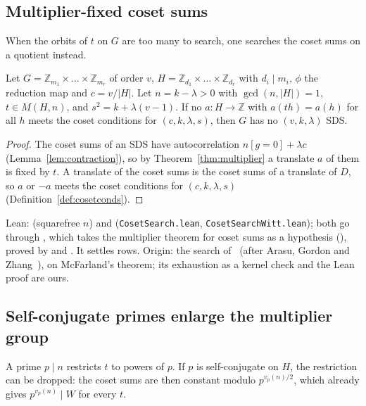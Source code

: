 \subsection{Multiplier-fixed coset sums}

When the orbits of $t$ on $G$ are too many to search, one searches the coset sums on a
quotient instead.

\begin{theorem}\label{thm:z28}
Let $G = \mathbb{Z}_{m_1} \times \dots \times \mathbb{Z}_{m_r}$ of order $v$,
$H = \mathbb{Z}_{d_1} \times \dots \times \mathbb{Z}_{d_r}$ with $d_i \mid m_i$, $\phi$ the
reduction map and $c = v/|H|$. Let $n = k - \lambda > 0$ with $\gcd(n, |H|) = 1$,
$t \in M(H, n)$, and $s^2 = k + \lambda(v-1)$. If no $a \colon H \to \mathbb{Z}$ with
$a(th) = a(h)$ for all $h$ meets the coset conditions for $(c, k, \lambda, s)$, then $G$ has no
$(v, k, \lambda)$ SDS.
\end{theorem}

\begin{proof}
The coset sums of an SDS have autocorrelation $n[g = 0] + \lambda c$
(Lemma~\ref{lem:contraction}), so by Theorem~\ref{thm:multiplier} a translate $a$ of them is
fixed by $t$. A translate of the coset sums is the coset sums of a translate of $D$, so $a$ or
$-a$ meets the coset conditions for $(c, k, \lambda, s)$ (Definition~\ref{def:cosetconds}).
\end{proof}

\begin{remark}
Lean:  (squarefree $n$) and 
(\texttt{CosetSearch.lean}, \texttt{CosetSearchWitt.lean}); both go through
, which takes the multiplier theorem for coset sums as a
hypothesis (), proved by  and
. It settles  rows. Origin: the search
of~\cite[\S5]{gordon} (after Arasu, Gordon and Zhang~\cite[Algorithm~1]{arasu-gordon-zhang}),
on McFarland's theorem; its exhaustion as a kernel check and the Lean proof are ours.
\end{remark}

\subsection{Self-conjugate primes enlarge the multiplier group}

A prime $p \mid n$ restricts $t$ to powers of $p$. If $p$ is self-conjugate on $H$, the
restriction can be dropped: the coset sums are then constant modulo $p^{v_p(n)/2}$, which
already gives $p^{v_p(n)} \mid W$ for every $t$.

